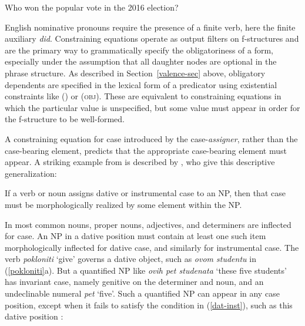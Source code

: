 \begin{exe}
\ex  Who won the popular vote in the 2016 election? 
\label{she}
\begin{xlist}
\end{xlist}
\end{exe}
English nominative pronouns require the presence of a finite verb, here the finite auxiliary \textit{did}.  Constraining equations operate as output filters on f-structures and are the primary way to grammatically specify the obligatoriness of a form, especially under the assumption that all daughter nodes are optional in the phrase structure.  As described in Section~\ref{valence-sec} above, obligatory dependents are specified in the lexical form of a predicator using existential constraints like (\up \subj) or (\up \textsc{obj}).  These are equivalent to constraining equations in which the particular value is unspecified, but some value must appear in order for the f-structure to be well-formed.  

A constraining equation for case  introduced by the case-\textit{assigner}, rather than the case-bearing element, predicts that the appropriate case-bearing element must appear.  A striking example from  is described by \citet[134]{WZ2003a}, who give this descriptive generalization:

\ea
{\label{dat-inst}
 \medskip

If a verb or noun assigns dative or instrumental case to an NP, then that case must be morphologically realized by some element within the NP.}
\z

\noindent
In  most common nouns, proper nouns, adjectives, and determiners are inflected for case.  An NP in a dative position must contain at least one such item morphologically inflected for dative case, and similarly for instrumental case.  The verb {\it pokloniti} `give' governs a dative object, such as \textit{ovom  studentu} in (\ref{pokloniti}a).  But a quantified NP like \textit{ovih pet studenata} `these five students' has invariant case, namely genitive on the determiner and noun, and an undeclinable numeral \textit{pet} `five'.  Such a quantified NP can appear in any case position, except when it fails to satisfy the condition in (\ref{dat-inst}), such as this dative position \citep[125]{WZ2003a}:

\begin{exe} 
\ex	\label{pokloniti} 
\begin{xlist}
\end{xlist}
\end{exe}

